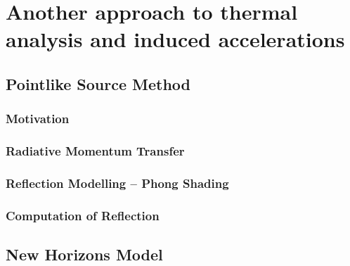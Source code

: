 \lipsum


\section{Another approach to thermal analysis and induced accelerations}
\label{sec:Thermal_Accelerations}

\lipsum

\subsection{Pointlike Source Method}
\label{sec:Source_method}

\lipsum

\subsubsection{Motivation}
\label{subsec:Source_method_motivation}

\lipsum

\subsubsection{Radiative Momentum Transfer}
\label{subsec:RadMomTransf}

\lipsum

\subsubsection{Reflection Modelling -- Phong Shading}
\label{subsec:Phong}

\lipsum

\subsubsection{Computation of Reflection}
\label{subsec:reflection_computation}

\lipsum

\subsection{New Horizons Model}
\label{sec:NH_Model}

